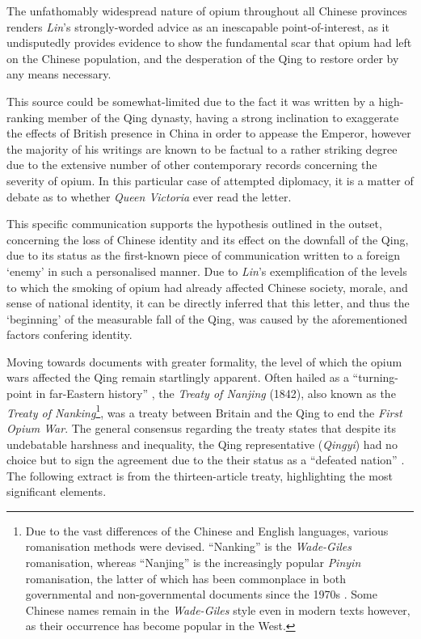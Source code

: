 \documentclass[a4paper,oneside]{article}
\begin{document}
The unfathomably widespread nature of opium throughout all Chinese provinces
renders \textit{Lin}'s strongly-worded advice as an inescapable
point-of-interest, as it undisputedly provides evidence to show the fundamental
scar that opium had left on the Chinese population, and the desperation of the
Qing to restore order by any means necessary.

This source could be somewhat-limited due to the fact it was written by a
high-ranking member of the Qing dynasty, having a strong inclination to
exaggerate the effects of British presence in China in order to appease the
Emperor, however the majority of his writings are known to be factual to a
rather striking degree due to the extensive number of other contemporary records
concerning the severity of opium.  In this particular case of attempted
diplomacy, it is a matter of debate as to whether \textit{Queen Victoria} ever
read the letter.

This specific communication supports the hypothesis outlined in the outset,
concerning the loss of Chinese identity and its effect on the downfall of the
Qing, due to its status as the first-known piece of communication written to a
foreign `enemy' in such a personalised manner. Due to \textit{Lin}'s
exemplification of the levels to which the smoking of opium had already affected
Chinese society, morale, and sense of national identity, it can be directly
inferred that this letter, and thus the `beginning' of the measurable fall of
the Qing, was caused by the aforementioned factors confering identity.

Moving towards documents with greater formality, the level of which the opium
wars affected the Qing remain startlingly apparent. Often hailed as a
``turning-point in far-Eastern history'' \autocite{Fairbank:1940}, the
\textit{Treaty of Nanjing} (1842), also known as the \textit{Treaty of
Nanking}\footnote{Due to the vast differences of the Chinese and English
languages, various romanisation methods were devised.  ``Nanking'' is the
\textit{Wade-Giles} romanisation, whereas ``Nanjing'' is the increasingly
popular \textit{Pinyin} romanisation, the latter of which has been commonplace
in both governmental and non-governmental documents since the 1970s
\autocite{Tao:1991}. Some Chinese names remain in the \textit{Wade-Giles} style
even in modern texts however, as their occurrence has become popular in the
West.}, was a treaty between Britain and the Qing to end the \textit{First Opium
War}. The general consensus regarding the treaty states that despite its
undebatable harshness and inequality, the Qing representative (\textit{Qingyi})
had no choice but to sign the agreement due to the their status as a ``defeated
nation'' \autocite{Mao:2018}. The following extract is from the thirteen-article
treaty, highlighting the most significant elements.
\end{document}
